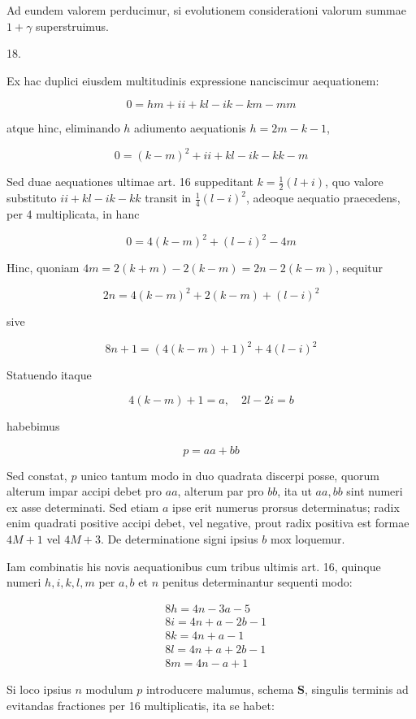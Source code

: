 \documentclass[10pt]{article}
\begin{document}
Ad eundem valorem perducimur, si evolutionem considerationi valorum summae \(1+\gamma\) superstruimus.

18.

Ex hac duplici eiusdem multitudinis expressione nanciscimur aequationem:

\[
0=h m+i i+k l-i k-k m-m m
\]

atque hinc, eliminando \(h\) adiumento aequationis \(h=2 m-k-1\),

\[
0=(k-m)^{2}+i i+k l-i k-k k-m
\]

Sed duae aequationes ultimae art. 16 suppeditant \(k=\frac{1}{2}(l+i)\), quo valore substituto \(i i+k l-i k-k k\) transit in \(\frac{1}{4}(l-i)^{2}\), adeoque aequatio praecedens, per 4 multiplicata, in hanc

\[
0=4(k-m)^{2}+(l-i)^{2}-4 m
\]

Hinc, quoniam \(4 m=2(k+m)-2(k-m)=2 n-2(k-m)\), sequitur

\[
2 n=4(k-m)^{2}+2(k-m)+(l-i)^{2}
\]

sive

\[
8 n+1=(4(k-m)+1)^{2}+4(l-i)^{2}
\]

Statuendo itaque

\[
4(k-m)+1=a, \quad 2 l-2 i=b
\]

habebimus

\[
p=a a+b b
\]

Sed constat, \(p\) unico tantum modo in duo quadrata discerpi posse, quorum alterum impar accipi debet pro \(a a\), alterum par pro \(b b\), ita ut \(a a, b b\) sint numeri ex asse determinati. Sed etiam \(a\) ipse erit numerus prorsus determinatus; radix enim quadrati positive accipi debet, vel negative, prout radix positiva est formae \(4 M+1\) vel \(4 M+3\). De determinatione signi ipsius \(b\) mox loquemur.

Iam combinatis his novis aequationibus cum tribus ultimis art. 16, quinque numeri \(h, i, k, l, m\) per \(a, b\) et \(n\) penitus determinantur sequenti modo:

\[
\begin{aligned}
& 8 h=4 n-3 a-5 \\
& 8 i=4 n+a-2 b-1 \\
& 8 k=4 n+a-1 \\
& 8 l=4 n+a+2 b-1 \\
& 8 m=4 n-a+1
\end{aligned}
\]

Si loco ipsius \(n\) modulum \(p\) introducere malumus, schema \(\boldsymbol{S}\), singulis terminis ad evitandas fractiones per 16 multiplicatis, ita se habet:
\end{document}
